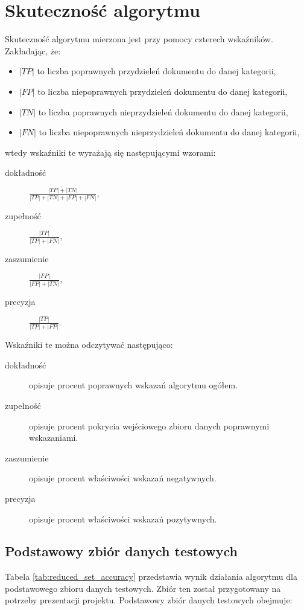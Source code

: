 \documentclass[a4paper,11pt]{article}
\begin{document}
\section{Skuteczność algorytmu}

Skuteczność algorytmu mierzona jest przy pomocy czterech wskaźników. Zakładając, że:
 
\begin{itemize}
 \item $|TP|$ to liczba poprawnych przydzieleń dokumentu do danej kategorii, 
 \item $|FP|$ to liczba niepoprawnych przydzieleń dokumentu do danej kategorii,
 \item $|TN|$ to liczba poprawnych nieprzydzieleń dokumentu do danej kategorii,
 \item $|FN|$ to liczba niepoprawnych nieprzydzieleń dokumentu do danej kategorii,
\end{itemize}

wtedy wskaźniki te wyrażają się następującymi wzorami:

\begin{description}
    \item[dokładność] $\frac{|TP| + |TN|}{|TP| + |TN| + |FP| + |FN|}$,
    \item[zupełność] $\frac{|TP|}{|TP| + |FN|}$,
    \item[zaszumienie] $\frac{|FP|}{|FP| + |TN|}$,
    \item[precyzja] $\frac{|TP|}{|TP| + |FP|}$.
\end{description}

Wskaźniki te można odczytywać następująco:

\begin{description}
    \item[dokładność] opisuje procent poprawnych wskazań algorytmu ogółem.
    \item[zupełność] opisuje procent pokrycia wejściowego zbioru danych poprawnymi wskazaniami.
    \item[zaszumienie] opisuje procent właściwości wskazań negatywnych.
    \item[precyzja] opisuje procent właściwości wskazań pozytywnych.
\end{description}

\subsection{Podstawowy zbiór danych testowych}

Tabela \ref{tab:reduced_set_accuracy} przedstawia wynik działania algorytmu dla podstawowego zbioru danych testowych. Zbiór ten został przygotowany na potrzeby prezentacji projektu. Podstawowy zbiór danych testowych obejmuje:
\end{document}
